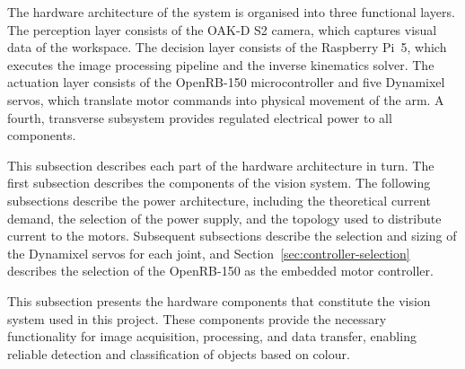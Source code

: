 \label{sec:hardware-architecture}
The hardware architecture of the system is organised into three 
functional layers. The perception layer consists of the OAK-D S2 
camera, which captures visual data of the workspace. The decision 
layer consists of the Raspberry Pi~5, which executes the image 
processing pipeline and the inverse kinematics solver. The actuation 
layer consists of the OpenRB-150 microcontroller and five Dynamixel 
servos, which translate motor commands into physical movement of 
the arm. A fourth, transverse subsystem provides regulated electrical 
power to all components.

This subsection describes each part of the hardware architecture in 
turn. The first subsection describes the components of the vision system. 
The following subsections describe the power architecture, including 
the theoretical current demand, the selection of the power supply, 
and the topology used to distribute current to the motors. 
Subsequent subsections describe the selection and sizing of the 
Dynamixel servos for each joint, and Section~\ref{sec:controller-selection} 
describes the selection of the OpenRB-150 as the embedded motor 
controller.




This subsection presents the hardware components that constitute the vision system used in
this project. These components provide the necessary functionality for image acquisition,
processing, and data transfer, enabling reliable detection and classification of objects based on
colour.

